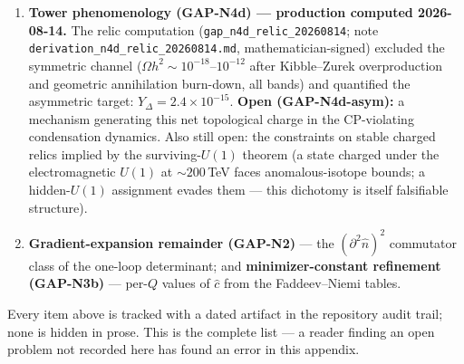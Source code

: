 \begin{enumerate}
(BdG: the pair-field landscape generates its own comb, $V_{\rm eff} \sim \Delta^2/W$);
the $\nu = (q-1)/q$ count was closed at the 1D-BdG level (exactly one deep-gap Andreev
state per winding core, topologically robust); the prefactor $2$ was shown to be the
sharp-cutoff BCS theorem (scheme band quantified); and $g = 4$ was identified as the
chiral spinor dimension of $Cl(6)$. What remains open, honestly: (i) the 2D BdG on the
true Abrikosov lattice (formality-level closure of the count); (ii) the two [ARG]-level
selections (sharp scheme from the hard lattice cutoff; $\Lambda = 1/\ell_P$); and
(iii) the look-elsewhere-corrected evidential weight of the $0.012\%$ $m_\tau$ hit is
$2\sigma$--$3\sigma$ --- strong support, not proof (VF.6 item 2026-08-14g).
\item \textbf{Tower phenomenology (GAP-N4d) --- production computed 2026-08-14.}
The relic computation (\texttt{gap\_n4d\_relic\_20260814}; note
\texttt{derivation\_\allowbreak n4d\_\allowbreak relic\_\allowbreak 20260814.md}, mathematician-signed) excluded the
symmetric channel ($\Omega h^2 \sim 10^{-18}$--$10^{-12}$ after Kibble--Zurek
overproduction and geometric annihilation burn-down, all bands) and quantified the
asymmetric target: $Y_\Delta = 2.4\times10^{-15}$. \textbf{Open (GAP-N4d-asym):} a
mechanism generating this net topological charge in the CP-violating condensation
dynamics. Also still open: the constraints on stable charged relics implied by the
surviving-$U(1)$ theorem (a state charged under the electromagnetic $U(1)$ at
$\sim\!200$\,TeV faces anomalous-isotope bounds; a hidden-$U(1)$ assignment evades them
--- this dichotomy is itself falsifiable structure).
\item \textbf{Gradient-expansion remainder (GAP-N2)} --- the $(\partial^2\hat n)^2$
commutator class of the one-loop determinant; and \textbf{minimizer-constant refinement
(GAP-N3b)} --- per-$Q$ values of $\hat c$ from the Faddeev--Niemi tables.
\end{enumerate}

\noindent Every item above is tracked with a dated artifact in the repository audit trail;
none is hidden in prose. This is the complete list --- a reader finding an open problem not
recorded here has found an error in this appendix.

